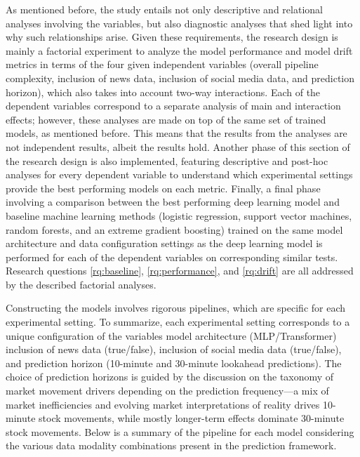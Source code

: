 \documentclass[stu,floatsintext]{apa7}
\begin{document}
As mentioned before, the study entails not only descriptive and relational analyses involving the variables, but also diagnostic analyses that shed light into why such relationships arise. Given these requirements, the research design is mainly a factorial experiment to analyze the model performance and model drift metrics in terms of the four given independent variables (overall pipeline complexity, inclusion of news data, inclusion of social media data, and prediction horizon), which also takes into account two-way interactions. Each of the dependent variables correspond to a separate analysis of main and interaction effects; however, these analyses are made on top of the same set of trained models, as mentioned before. This means that the results from the analyses are not independent results, albeit the results hold. Another phase of this section of the research design is also implemented, featuring descriptive and post-hoc analyses for every dependent variable to understand which experimental settings provide the best performing models on each metric. Finally, a final phase involving a comparison between the best performing deep learning model and baseline machine learning methods (logistic regression, support vector machines, random forests, and an extreme gradient boosting) trained on the same model architecture and data configuration settings as the deep learning model is performed for each of the dependent variables on corresponding similar tests. Research questions \ref{rq:baseline}, \ref{rq:performance}, and \ref{rq:drift} are all addressed by the described factorial analyses.

Constructing the models involves rigorous pipelines, which are specific for each experimental setting. To summarize, each experimental setting corresponds to a unique configuration of the variables model architecture (MLP/Transformer) inclusion of news data (true/false), inclusion of social media data (true/false), and prediction horizon (10-minute and 30-minute lookahead predictions). The choice of prediction horizons is guided by the discussion on the taxonomy of market movement drivers depending on the prediction frequency—a mix of market inefficiencies and evolving market interpretations of reality drives 10-minute stock movements, while mostly longer-term effects dominate 30-minute stock movements. Below is a summary of the pipeline for each model considering the various data modality combinations present in the prediction framework.
\end{document}
